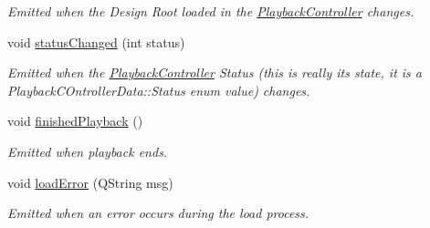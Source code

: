 \begin{DoxyCompactItemize}
\begin{DoxyCompactList}\small\item\em Emitted when the Design Root loaded in the \hyperlink{class_playback_controller}{Playback\-Controller} changes. \end{DoxyCompactList}\item 
\hypertarget{class_playback_controller_a66adff4299db16e37e92776f5caffdbe}{void \hyperlink{class_playback_controller_a66adff4299db16e37e92776f5caffdbe}{status\-Changed} (int status)}\label{class_playback_controller_a66adff4299db16e37e92776f5caffdbe}

\begin{DoxyCompactList}\small\item\em Emitted when the \hyperlink{class_playback_controller}{Playback\-Controller} Status (this is really its state, it is a Playback\-C\-Ontroller\-Data\-::\-Status enum value) changes. \end{DoxyCompactList}\item 
\hypertarget{class_playback_controller_accee38d1b0339100ec76b047dc5d08ec}{void \hyperlink{class_playback_controller_accee38d1b0339100ec76b047dc5d08ec}{finished\-Playback} ()}\label{class_playback_controller_accee38d1b0339100ec76b047dc5d08ec}

\begin{DoxyCompactList}\small\item\em Emitted when playback ends. \end{DoxyCompactList}\item 
void \hyperlink{class_playback_controller_a1cc0f95c904b3d1055544c833f9efcaa}{load\-Error} (Q\-String msg)
\begin{DoxyCompactList}\small\item\em Emitted when an error occurs during the load process. \end{DoxyCompactList}\end{DoxyCompactItemize}
